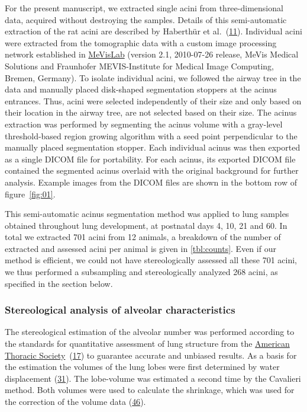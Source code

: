 \documentclass[
  american,
]{article}
\begin{document}
For the present manuscript, we extracted single acini from three-dimensional data, acquired without destroying the samples.
Details of this semi-automatic extraction of the rat acini are described by Haberthür et al.~(\protect\hyperlink{ref-7YLeeyu}{11}).
Individual acini were extracted from the tomographic data with a custom image processing network established in \href{https://www.mevislab.de/}{MeVisLab} (version 2.1, 2010-07-26 release, MeVis Medical Solutions and Fraunhofer MEVIS-Institute for Medical Image Computing, Bremen, Germany).
To isolate individual acini, we followed the airway tree in the data and manually placed disk-shaped segmentation stoppers at the acinus entrances.
Thus, acini were selected independently of their size and only based on their location in the airway tree, are not selected based on their size.
The acinus extraction was performed by segmenting the acinus volume with a gray-level threshold-based region growing algorithm with a seed point perpendicular to the manually placed segmentation stopper.
Each individual acinus was then exported as a single DICOM file for portability.
For each acinus, its exported DICOM file contained the segmented acinus overlaid with the original background for further analysis.
Example images from the DICOM files are shown in the bottom row of figure~\ref{fig:01}.

This semi-automatic acinus segmentation method was applied to lung samples obtained throughout lung development, at postnatal days 4, 10, 21 and 60.
In total we extracted 701 acini from 12 animals, a breakdown of the number of extracted and assessed acini per animal is given in \ref{tbl:counts}.
Even if our method is efficient, we could not have stereologically assessed all these 701 acini, we thus performed a subsampling and stereologically analyzed 268 acini, as specified in the section below.

\hypertarget{stereological-analysis-of-alveolar-characteristics}{%
\subsubsection{Stereological analysis of alveolar characteristics}\label{stereological-analysis-of-alveolar-characteristics}}

The stereological estimation of the alveolar number was performed according to the standards for quantitative assessment of lung structure from the \href{http://www.thoracic.org/}{American Thoracic Society}~(\protect\hyperlink{ref-dNc8FfNn}{17}) to guarantee accurate and unbiased results.
As a basis for the estimation the volumes of the lung lobes were first determined by water displacement (\protect\hyperlink{ref-KGbSQovR}{31}).
The lobe-volume was estimated a second time by the Cavalieri method.
Both volumes were used to calculate the shrinkage, which was used for the correction of the volume data (\protect\hyperlink{ref-wnl86DEM}{46}).
\end{document}
